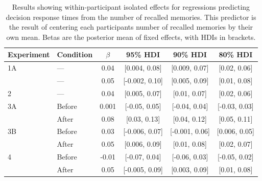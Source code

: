 \documentclass[10pt,letterpaper]{article}
\begin{document}
\clearpage
\begin{table}[h!]
\centering
\footnotesize
\begin{tabular}{llcccc}
\hline
Experiment & Condition & $\beta$ & 95\% HDI & 90\% HDI & 80\% HDI \\
\hline
1A & --- & 0.04 & [0.004, 0.08] & [0.009, 0.07] & [0.02, 0.06] \\
& --- & 0.05 & [-0.002, 0.10] & [0.005, 0.09] & [0.01, 0.08] \\
2 & --- & 0.04 & [0.005, 0.07] & [0.01, 0.07] & [0.02, 0.06] \\
\hline
3A & Before & 0.001 & [-0.05, 0.05] & [-0.04, 0.04] & [-0.03, 0.03] \\
& After & 0.08 & [0.03, 0.13] & [0.04, 0.12] & [0.05, 0.11] \\
\hline
3B & Before & 0.03 & [-0.006, 0.07] & [-0.001, 0.06] & [0.006, 0.05] \\
& After & 0.05 & [0.006, 0.09] & [0.01, 0.08] & [0.02, 0.07] \\
\hline
4 & Before & -0.01 & [-0.07, 0.04] & [-0.06, 0.03] & [-0.05, 0.02] \\
& After & 0.05 & [-0.005, 0.09] & [0.003, 0.09] & [0.01, 0.08] \\
\hline
\end{tabular}
\caption{Results showing within-participant isolated effects for regressions predicting decision response times from the number of recalled memories. This predictor is the result of centering each participants number of recalled memories by their own mean. Betas are the posterior mean of fixed effects, with HDIs in brackets.}
\label{tab:memory_main_effects}
\end{table}
\clearpage
\end{document}
